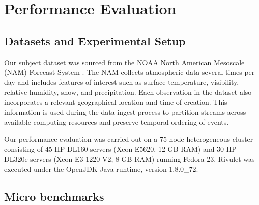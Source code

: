 \section{Performance Evaluation}
\label{sec:performance}

\subsection{Datasets and Experimental Setup}
Our subject dataset was sourced from the NOAA North American Mesoscale (NAM) Forecast System \cite{noaa_nam}.  The NAM collects atmospheric data several times per day and includes features of interest such as surface temperature, visibility, relative humidity, snow, and precipitation. Each observation in the dataset also incorporates a relevant geographical location and time of creation. This information is used during the data ingest process to partition streams across available computing resources and preserve temporal ordering of events.

Our performance evaluation was carried out on a 75-node heterogeneous cluster consisting of 45 HP DL160 servers (Xeon E5620, 12 GB RAM) and 30 HP DL320e servers (Xeon E3-1220 V2, 8 GB RAM) running Fedora 23. Rivulet was executed under the OpenJDK Java runtime, version 1.8.0\_72.

\subsection{Micro benchmarks}
